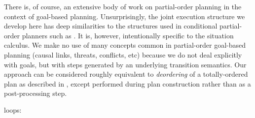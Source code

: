 There is, of course, an extensive body of work on partial-order planning
in the context of goal-based planning. Unsurprisingly, the joint execution
structure we develop here has deep similarities to the structures
used in conditional partial-order planners such as \citep{peot92conditional_nonlinear}.
It is, however, intentionally specific to the situation calculus.
We make no use of many concepts common in partial-order goal-based
planning (causal links, threats, conflicts, etc) because we do not
deal explicitly with goals, but with steps generated by an underlying
transition semantics. Our approach can be considered roughly equivalent
to \emph{deordering} of a totally-ordered plan as described in \citep{backstrom99reordering},
except performed during plan construction rather than as a post-processing
step.

loops: \citep{levesque96what_is_planning,levesque05planning_with_loops}

